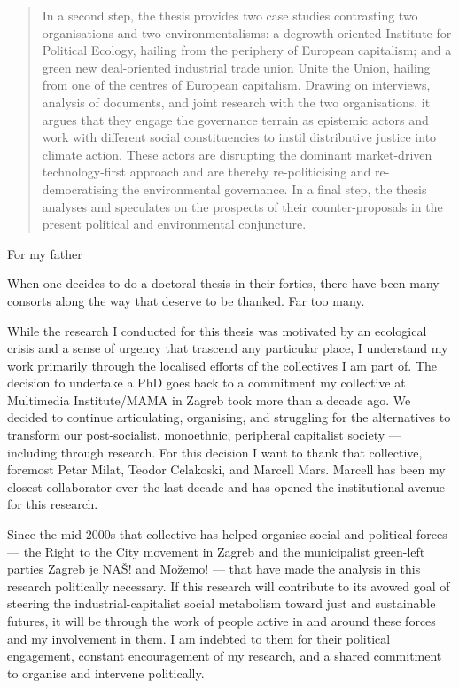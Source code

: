 \documentclass[a4paper, nobind]{templates/ociamthesis}
\begin{document}
\begin{romanpages}
\begin{abstract}
 In a second step, the thesis provides two case studies contrasting two organisations and two environmentalisms: a degrowth-oriented Institute for Political Ecology, hailing from the periphery of European capitalism; and a green new deal-oriented industrial trade union Unite the Union, hailing from one of the centres of European capitalism. Drawing on interviews, analysis of documents, and joint research with the two organisations, it argues that they engage the governance terrain as epistemic actors and work with different social constituencies to instil distributive justice into climate action. These actors are disrupting the dominant market-driven technology-first approach and are thereby re-politicising and re-democratising the environmental governance. In a final step, the thesis analyses and speculates on the prospects of their counter-proposals in the present political and environmental conjuncture.
\end{abstract}



\begin{dedication}
  For my father
\end{dedication}



\begin{acknowledgements}
 	When one decides to do a doctoral thesis in their forties, there have been many consorts along the way that deserve to be thanked. Far too many.

  While the research I conducted for this thesis was motivated by an ecological crisis and a sense of urgency that trascend any particular place, I understand my work primarily through the localised efforts of the collectives I am part of. The decision to undertake a PhD goes back to a commitment my collective at Multimedia Institute/MAMA in Zagreb took more than a decade ago. We decided to continue articulating, organising, and struggling for the alternatives to transform our post-socialist, monoethnic, peripheral capitalist society --- including through research. For this decision I want to thank that collective, foremost Petar Milat, Teodor Celakoski, and Marcell Mars. Marcell has been my closest collaborator over the last decade and has opened the institutional avenue for this research.

  Since the mid-2000s that collective has helped organise social and political forces --- the Right to the City movement in Zagreb and the municipalist green-left parties Zagreb je NAŠ! and Možemo! --- that have made the analysis in this research politically necessary. If this research will contribute to its avowed goal of steering the industrial-capitalist social metabolism toward just and sustainable futures, it will be through the work of people active in and around these forces and my involvement in them. I am indebted to them for their political engagement, constant encouragement of my research, and a shared commitment to organise and intervene politically.


\end{acknowledgements}
\end{romanpages}
\end{document}
